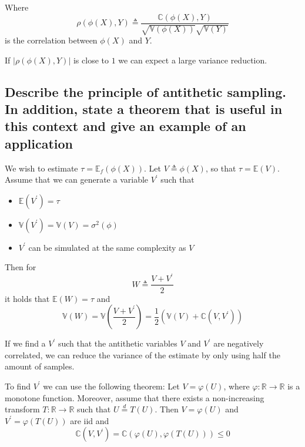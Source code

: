 \documentclass[a4paper]{article}
\begin{document}
Where
\begin{equation}
    \rho(\phi(X),Y) \triangleq \frac{\mathbb{C}(\phi(X),Y)}{\sqrt{\mathbb{V}(\phi(X))}\sqrt{\mathbb{V}(Y)}}
\end{equation}
is the correlation between $\phi(X)$ and $Y$.

If $|\rho(\phi(X),Y)|$ is close to $1$ we can expect a large variance reduction.

\newpage
\subsection[Antithetic Sampling]{Describe the principle of antithetic sampling. In addition, state a theorem that is useful in
this context and give an example of an application}
We wish to estimate $\tau = \mathbb{E}_f(\phi(X))$. Let $V \triangleq \phi(X)$, so that $\tau = \mathbb{E}(V)$.
Assume that we can generate a variable $V^\prime$ such that
\begin{itemize}
    \item $\mathbb{E}(V^\prime) = \tau$
    \item $\mathbb{V}(V^\prime) = \mathbb{V}(V) = \sigma^2(\phi)$
    \item $V^\prime$ can be simulated at the same complexity as $V$
\end{itemize}
Then for
\begin{equation}
    W \triangleq \frac{V+V^\prime}{2}
\end{equation}
it holds that $\mathbb{E}(W) = \tau$ and
\begin{equation}
    \mathbb{V}(W) = \mathbb{V}(\frac{V + V^\prime}{2}) = \frac{1}{2}(\mathbb{V}(V) + \mathbb{C}(V,V^\prime))
\end{equation}

If we find a $V^\prime$ such that the antithetic variables $V$ and $V^\prime$ are negatively correlated, we can reduce the variance of the estimate by only using half the amount of samples.

To find $V^\prime$ we can use the following theorem:
Let $V = \varphi(U)$, where $\varphi : \mathbb{R} \rightarrow \mathbb{R}$ is a monotone function. Moreover, assume that there exists a non-increasing transform $T : \mathbb{R} \rightarrow \mathbb{R}$ such that $U \overset{d}{=} T(U)$. Then $V = \varphi(U)$ and $V^\prime = \varphi(T(U))$ are iid and
\begin{equation}
    \mathbb{C}(V,V^\prime) = \mathbb{C}(\varphi(U),\varphi(T(U))) \leq 0
\end{equation}
\end{document}
